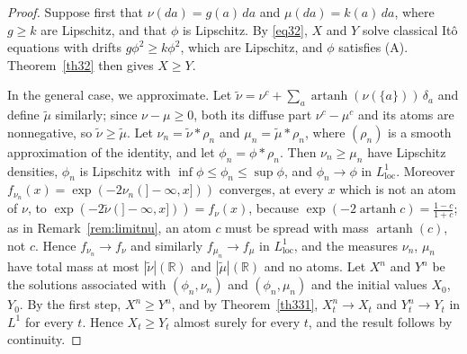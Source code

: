 \begin{proof}
	Suppose first that $\nu(da)=g(a)\,da$ and $\mu(da)=k(a)\,da$, where $g\geqslant k$
	are Lipschitz, and that $\phi$ is Lipschitz. By \eqref{eq32}, $X$ and $Y$ solve
	classical It\^o equations with drifts $g\phi^2\geqslant k\phi^2$, which are Lipschitz,
	and $\phi$ satisfies (A). Theorem~\ref{th32} then gives $X \geqslant Y$.

	In the general case, we approximate. Let
	$\tilde\nu = \nu^c + \sum_a \operatorname{artanh}(\nu(\{a\}))\,\delta_a$ and define
	$\tilde\mu$ similarly; since $\nu-\mu\geqslant 0$, both its diffuse part
	$\nu^c - \mu^c$ and its atoms are nonnegative, so $\tilde\nu\geqslant\tilde\mu$.
	Let $\nu_n = \tilde\nu * \rho_n$ and $\mu_n = \tilde\mu * \rho_n$, where $(\rho_n)$ is a
	smooth approximation of the identity, and let $\phi_n = \phi * \rho_n$. Then
	$\nu_n \geqslant \mu_n$ have Lipschitz densities, $\phi_n$ is Lipschitz with
	$\inf\phi\leqslant\phi_n\leqslant\sup\phi$, and $\phi_n\to\phi$ in $L^1_{\mathrm{loc}}$.
	Moreover $f_{\nu_n}(x) = \exp(-2\nu_n(]-\infty,x]))$ converges, at every $x$ which is
	not an atom of $\nu$, to
	$\exp(-2\tilde\nu(]-\infty,x])) = f_\nu(x)$, because
	$\exp(-2\operatorname{artanh} c) = \frac{1-c}{1+c}$; as in Remark~\ref{rem:limitnu},
	an atom $c$ must be spread with mass $\operatorname{artanh}(c)$, not $c$. Hence
	$f_{\nu_n}\to f_\nu$ and similarly $f_{\mu_n}\to f_\mu$ in $L^1_{\mathrm{loc}}$, and the
	measures $\nu_n$, $\mu_n$ have total mass at most $|\tilde\nu|(\mathbb{R})$ and
	$|\tilde\mu|(\mathbb{R})$ and no atoms. Let $X^n$ and $Y^n$ be the solutions associated with
	$(\phi_n,\nu_n)$ and $(\phi_n,\mu_n)$ and the initial values $X_0$, $Y_0$. By the
	first step, $X^n\geqslant Y^n$, and by Theorem~\ref{th331}, $X^n_t\to X_t$ and
	$Y^n_t\to Y_t$ in $L^1$ for every $t$. Hence $X_t\geqslant Y_t$ almost surely for
	every $t$, and the result follows by continuity.
\end{proof}
